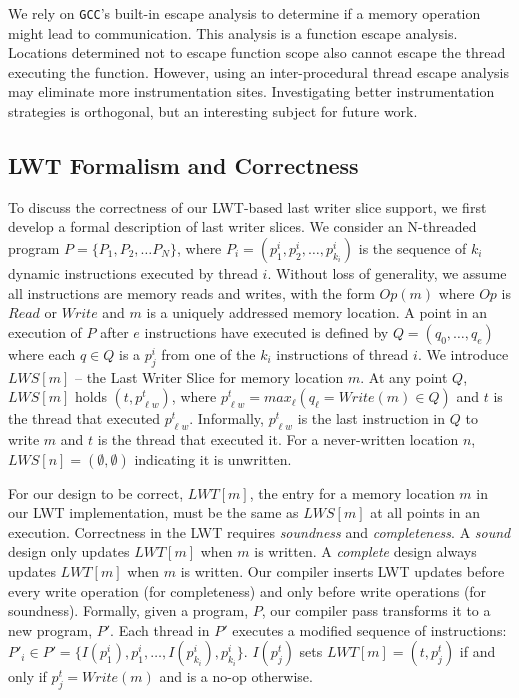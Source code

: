 \documentclass[preprint,9pt]{sigplanconf}
\newcommand{\lwt}{LWT\xspace}
\begin{document}
We rely on {\tt GCC}'s built-in escape analysis to determine if a memory
operation might lead to communication.  This analysis is a function escape
analysis.  Locations determined not to escape function scope also cannot escape
the thread executing the function.  However, using an inter-procedural thread
escape analysis may eliminate more instrumentation sites.  Investigating better
instrumentation strategies is orthogonal, but an interesting subject for future
work.

\subsection{\lwt Formalism and Correctness}
\label{sec:lwssoundness}
To discuss the correctness of our \lwt-based last writer slice support, we
first develop a formal description of last writer slices.  We consider an
N-threaded program $P = \{P_1, P_2, \ldots P_N\}$, where $P_i = (p^{i}_{1},
p^{i}_{2}, \ldots, p^{i}_{k_{i}})$ is the sequence of $k_{i}$ dynamic
instructions executed by thread $i$.  Without loss of generality, we assume all
instructions are memory reads and writes, with the form $Op(m)$ where $Op$ is
$Read$ or $Write$ and $m$ is a uniquely addressed memory location.
A point in an execution of $P$ after $e$ instructions have
executed is defined by $Q = (q_{0}, \ldots, q_{e})$ where each $q \in Q$ is a
$p^{i}_{j}$ from one of the $k_i$ instructions of thread $i$.  We introduce
$LWS[m]$ -- the Last Writer Slice for memory location $m$.   At any point $Q$,
$LWS[m]$ holds $(t,p^{t}_{\ell w})$, where $p^{t}_{\ell w} = max_{\ell}( 
q_{\ell} = Write(m) \in Q)$ and $t$ is the thread that
executed $p^{t}_{\ell w}$. Informally, $p^{t}_{\ell w}$ is the last instruction
in $Q$ to write $m$ and $t$ is the thread that executed it.  For a
never-written location $n$, $LWS[n] = (\emptyset,\emptyset)$ indicating it is
unwritten.

For our design to be correct, $LWT[m]$, the entry for a memory location $m$ in
our \lwt implementation, must be the same as $LWS[m]$ at all points in an
execution.  Correctness in the \lwt requires {\em soundness} and {\em
completeness}.  A {\em sound} design only updates $LWT[m]$ when $m$ is
written.  A {\em complete} design always updates $LWT[m]$ when $m$ is written.
Our compiler inserts \lwt updates before every write
operation (for completeness) and only before write operations (for soundness).
Formally, given a program, $P$, our compiler pass transforms it to a new
program, $P'$.  Each thread in $P'$ executes a modified sequence of
instructions: $P'_{i} \in P' = \{ I(p^{i}_{1}), p^{i}_{1}, \ldots,
I(p^{i}_{k_{i}}), p^{i}_{k_{i}} \}$.  $I(p^{t}_{j})$ sets $LWT[m] =
(t,p^{t}_{j})$ if and only if $p^{t}_{j} = Write(m)$ and is a no-op otherwise.
\end{document}
